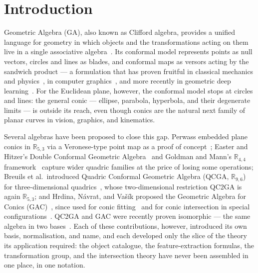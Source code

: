 \documentclass{birkjour}
\theoremstyle{definition}
\theoremstyle{remark}
\begin{document}
\section{Introduction}
\label{sec:intro}

Geometric Algebra (GA), also known as Clifford algebra, provides a unified
language for geometry in which objects and the transformations acting on them
live in a single associative algebra~\cite{dorst_geometric_2010,
perwass_geometric_2009}. Its conformal model represents points as null
vectors, circles and lines as blades, and conformal maps as versors acting by
the sandwich product --- a formulation that has proven fruitful in classical
mechanics and physics~\cite{hestenes_new_2012,hestenes_zitterbewegung_1990,
gregory_elastic_2017}, in computer graphics~\cite{de_keninck_non-parametric_2019},
and more recently in geometric deep learning~\cite{buchholz_optimal_2007,
ruhe_geometric_2023}. For the Euclidean plane, however, the conformal model
stops at circles and lines: the general conic --- ellipse, parabola,
hyperbola, and their degenerate limits --- is outside its reach, even though
conics are the natural next family of planar curves in vision, graphics, and
kinematics.

Several algebras have been proposed to close this gap. Perwass embedded plane
conics in $\mathbb{R}_{5,3}$ via a Veronese-type point map as a proof of
concept~\cite{perwass_geometric_2009}; Easter and Hitzer's Double Conformal
Geometric Algebra~\cite{easter_double_2017} and Goldman and Mann's
$\mathbb{R}_{4,4}$ framework~\cite{goldman_r4_2015} capture wider quadric
families at the price of losing some operations; Breuils et al.\ introduced
Quadric Conformal Geometric Algebra (QCGA, $\mathbb{R}_{9,6}$) for
three-dimensional quadrics~\cite{breuils2018quadric,
breuils_three-dimensional_2019}, whose two-dimensional restriction QC2GA is
again $\mathbb{R}_{5,3}$; and Hrdina, N\'avrat, and Va\v{s}\'ik proposed the
Geometric Algebra for Conics (GAC)~\cite{hrdina_geometric_2018}, since used
for conic fitting~\cite{2024-01-09louckaAlgorithmsConicFitting} and for conic
intersection in special configurations~\cite{byrtus_specific_2021}. QC2GA and
GAC were recently proven isomorphic --- the same algebra in two
bases~\cite{chomicki_intersection_2023}. Each of these contributions, however,
introduced its own basis, normalisation, and name, and each developed only the
slice of the theory its application required: the object catalogue, the
feature-extraction formulas, the transformation group, and the intersection
theory have never been assembled in one place, in one notation.
\end{document}
